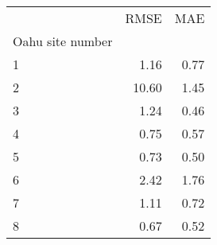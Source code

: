 \begin{tabular}{lrr}
\toprule
 & RMSE & MAE \\
Oahu site number &  &  \\
\midrule
1 & 1.16 & 0.77 \\
2 & 10.60 & 1.45 \\
3 & 1.24 & 0.46 \\
4 & 0.75 & 0.57 \\
5 & 0.73 & 0.50 \\
6 & 2.42 & 1.76 \\
7 & 1.11 & 0.72 \\
8 & 0.67 & 0.52 \\
\bottomrule
\end{tabular}
